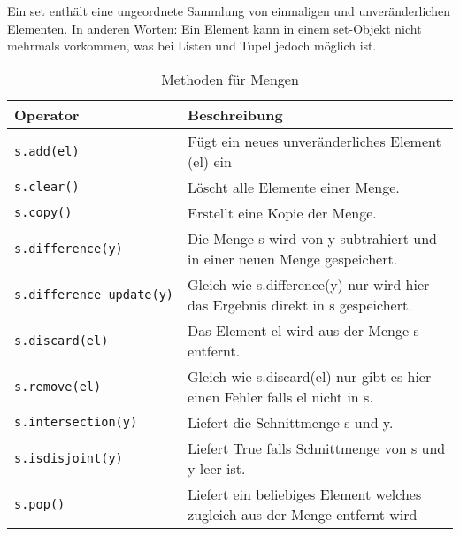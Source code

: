 Ein set enthält eine ungeordnete Sammlung von einmaligen und unveränderlichen Elementen. In anderen Worten: Ein Element kann in einem set-Objekt nicht mehrmals vorkommen, was bei Listen und Tupel jedoch möglich ist.

\begin{table}[H]
\begin{threeparttable}
\caption{Methoden für Mengen}
\begin{tabular}{|l|l|}
	\hline 
	\textbf{Operator} &\textbf{Beschreibung}\\ 
	\hline 
	\texttt{s.add(el)} &Fügt ein neues unveränderliches Element (el) ein\\
	\texttt{s.clear()} &Löscht alle Elemente einer Menge.\\
	\texttt{s.copy()} &Erstellt eine Kopie der Menge.\\
	\texttt{s.difference(y)} &Die Menge s wird von y subtrahiert und in einer neuen Menge gespeichert.\\
	\texttt{s.difference\_update(y)} &Gleich wie s.difference(y) nur wird hier das Ergebnis direkt in s gespeichert.\\
	\texttt{s.discard(el)} &Das Element el wird aus der Menge s entfernt.\\
	\texttt{s.remove(el)} &Gleich wie s.discard(el) nur gibt es hier einen Fehler falls el nicht in s.\\
	\texttt{s.intersection(y)} &Liefert die Schnittmenge s und y.\\
	\texttt{s.isdisjoint(y)} &Liefert True falls Schnittmenge von s und y leer ist.\\
	\texttt{s.pop()} &Liefert ein beliebiges Element welches zugleich aus der Menge entfernt wird\\
	\hline 
\end{tabular}
\end{threeparttable}
\end{table}
